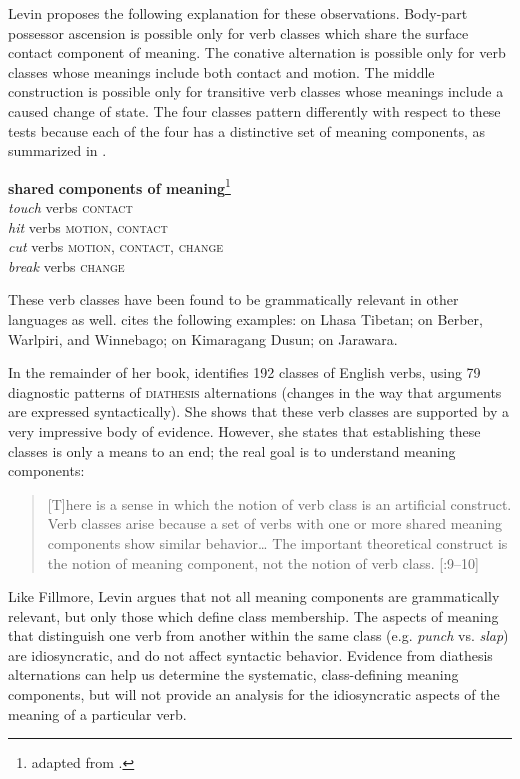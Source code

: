 Levin proposes the following explanation for these observations. Body-part possessor ascension is possible only for verb classes which share the surface contact component of meaning. The conative alternation is possible only for verb classes whose meanings include both contact and motion. The middle construction is possible only for transitive verb classes whose meanings include a caused change of state. The four classes pattern differently with respect to these tests because each of the four has a distinctive set of meaning components, as summarized in .


\ea \label{ex:7.32}
\textbf{shared} \textbf{components of meaning}\footnote{adapted from \citet[268]{Saeed2009}.}\\
\textit{touch} verbs  \textsc{contact}\textit{\\
hit} verbs  \textsc{motion, contact}\textit{\\
cut} verbs  \textsc{motion, contact, change}\textit{\\
break} verbs  \textsc{change}
\z


These verb classes have been found to be grammatically relevant in other languages as well. \citet{Levin2015} cites the following examples: \citet{DeLancey1995,DeLancey2000} on Lhasa Tibetan; \citet{GuersselEtAl1985} on Berber, Warlpiri, and Winnebago; \citet{Kroeger2010} on Kimaragang Dusun; \citet{Vogel2005} on Jarawara.

In the remainder of her book, \citet{Levin1993} identifies 192 classes of English verbs, using 79 diagnostic patterns of \textsc{diathesis} alternations (changes in the way that arguments are expressed syntactically). She shows that these verb classes are supported by a very impressive body of evidence. However, she states that establishing these classes is only a means to an end; the real goal is to understand meaning components:


\begin{quote}
{}[T]here is a sense in which the notion of verb class is an artificial construct. Verb classes arise because a set of verbs with one or more shared meaning components show similar behavior… The important theoretical construct is the notion of meaning component, not the notion of verb class. [\citealt{Levin1993}:9–10]
\end{quote}


Like Fillmore, Levin argues that not all meaning components are grammatically relevant, but only those which define class membership. The aspects of meaning that distinguish one verb from another within the same class (e.g. \textit{punch} vs. \textit{slap}) are idiosyncratic, and do not affect syntactic behavior. Evidence from diathesis alternations can help us determine the systematic, class-defining meaning components, but will not provide an analysis for the idiosyncratic aspects of the meaning of a particular verb.

